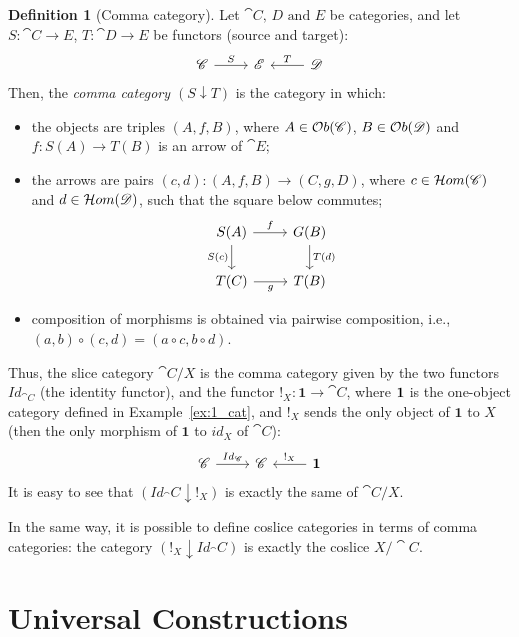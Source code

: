 \documentclass[a4paper, twoside,openright]{report}
\theoremstyle{plain}
\theoremstyle{definition}
\newtheorem{definition}[theorem]{Definition}
\begin{document}
\begin{definition}[Comma category]\label{def:comma_category}
    Let $\cat{C \text{, } D \text{ and } E}$ be categories, and let $S: \cat{C \rightarrow E}$, $T:\cat{D \rightarrow E}$ be functors (source and target):
    \[
        \begin{tikzcd}
            \cat{C} \arrow[r, "S"] & \cat{E} & \cat{D} \arrow[l, "T" swap]
        \end{tikzcd}
    \]
    Then, the \emph{comma category $(S \downarrow T)$} is the category in which: 
    \begin{itemize}
        \item the objects are triples $(A, f, B)$, where $A \in \mathcal{O}b(\mathscr{C})$, $B \in \mathcal{O}b(\mathscr{D})$ and $f: S(A) \rightarrow T(B)$ is an arrow of $\cat E$;
        \item the arrows are pairs $(c, d): (A, f, B) \rightarrow (C, g, D)$, where $c \in \mathcal{H}om(\mathscr{C})$ and $d \in \mathcal{H}om(\mathscr{D})$, such that the square below commutes;
        \[
            \begin{tikzcd}
            S(A) \arrow[r, "f"] \arrow[d, "S(c)" swap] & G(B) \arrow[d, "T(d)"] \\
            T(C) \arrow[r, "g" swap] & T(B)
            \end{tikzcd}
        \]
        \item composition of morphisms is obtained via pairwise composition, i.e., $(a, b) \circ (c, d) = (a \circ c, b \circ d)$.
    \end{itemize}
\end{definition}

Thus, the slice category $\cat C / X$ is the comma category given by the two functors $Id_{\cat C}$ (the identity functor), and the functor $!_X: \textbf{1} \rightarrow \cat C$, where $\textbf 1$ is the one-object category defined in Example~\ref{ex:1_cat}, and $!_X$ sends the only object of $\textbf{1}$ to $X$ (then the only morphism of $\textbf{1}$ to $id_X$ of $\cat C$):
\[
    \begin{tikzcd}
        \cat C \arrow[r, "{Id_\cat C}"] & \cat C & \textbf{1} \arrow[l, "{!_X}"swap]
    \end{tikzcd}
\]
It is easy to see that $(Id_\cat C \downarrow !_X)$ is exactly the same of $\cat C / X$.

In the same way, it is possible to define coslice categories in terms of comma categories: the category $(!_X \downarrow Id_\cat C)$ is exactly the coslice $X / \cat C$.


\section{Universal Constructions}\label{sect:univ_constr}
\end{document}
